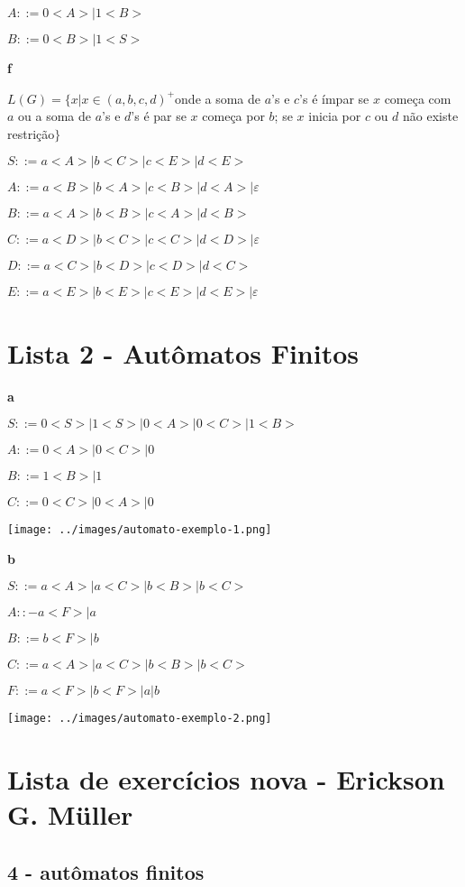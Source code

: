 \documentclass[ ]{article}
\begin{document}
	$A::= 0<A> | 1<B>$ %
	
	$B::= 0<B> | 1<S> $ %
	
	\textbf{f}
	
	$L(G) = \{ x | x \in (a,b,c,d)^+$onde a soma de $a$'s e $c$'s é ímpar se $x$ começa com $a$ ou a soma de $a$'s e $d$'s é par se $x$ começa por $b$; se $x$ inicia por $c$ ou $d$ não existe restrição$\}$
	
	$S::= a<A> | b<C> | c<E> | d<E> $ %
	
	$A::= a<B> | b<A> | c<B> | d<A> | \varepsilon$ %
	
	$B::= a<A> | b<B> | c<A> | d<B>$ %
	
	$C::= a<D> | b<C> | c<C> | d<D> | \varepsilon$ %

	$D::= a<C> | b<D> | c<D> | d<C>$ %
	
	$E::= a<E> | b<E> | c<E> | d<E> | \varepsilon$
	\section*{Lista 2 - Autômatos Finitos}
		\textbf{a}
		
		$S::= 0<S> | 1<S> | 0<A> | 0<C> | 1<B>$
		
		$A::= 0<A> | 0<C> | 0$
		
		$B::= 1<B> | 1$
		
		$C::= 0<C> | 0<A> | 0$
		
		\texttt{[image: ../images/automato-exemplo-1.png]}
		
		\textbf{b}
		
		$S::= a<A> | a<C> | b<B> | b<C>$
		
		$A::- a<F> | a$
		
		$B::= b<F> | b$
		
		$C::= a<A> | a<C> | b<B> | b<C>$
		
		$F::= a<F> | b<F> | a | b$
		
		\texttt{[image: ../images/automato-exemplo-2.png]}
		\newpage
	\section*{Lista de exercícios nova - Erickson G. Müller}
		\subsection{4 - autômatos finitos}
\end{document}
